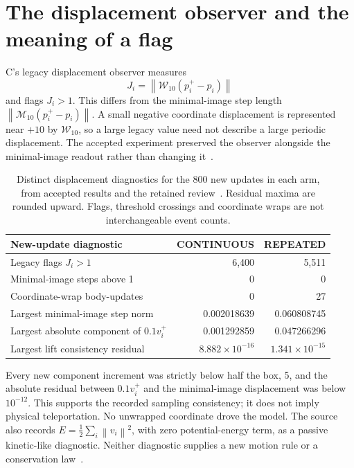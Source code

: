 \documentclass[11pt,a4paper]{article}
\newcommand{\norm}[1]{\left\lVert #1\right\rVert}
\newcommand{\mi}{\mathcal M_{10}}
\newcommand{\wrap}{\mathcal W_{10}}
\begin{document}
\section{The displacement observer and the meaning of a flag}
\label{sec:observer}
C's legacy displacement observer measures
\begin{equation}
 J_i=\norm{\wrap(p_i^+-p_i)}
 \label{eq:legacy}
\end{equation}
and flags $J_i>1$. This differs from the minimal-image step length $\norm{\mi(p_i^+-p_i)}$. A small negative coordinate displacement is represented near $+10$ by $\wrap$, so a large legacy value need not describe a large periodic displacement. The accepted experiment preserved the observer alongside the minimal-image readout rather than changing it~\cite{source,sim02}.

\begin{table}[htbp]
\centering\small
\begin{tabular}{lrr}
\toprule New-update diagnostic & CONTINUOUS & REPEATED \\
\midrule
Legacy flags $J_i>1$ & 6,400 & 5,511 \\
Minimal-image steps above 1 & 0 & 0 \\
Coordinate-wrap body-updates & 0 & 27 \\
Largest minimal-image step norm & 0.002018639 & 0.060808745 \\
Largest absolute component of $0.1v_i^+$ & 0.001292859 & 0.047266296 \\
Largest lift consistency residual & $8.882\!\times\!10^{-16}$ & $1.341\!\times\!10^{-15}$ \\
\bottomrule
\end{tabular}
\caption{Distinct displacement diagnostics for the 800 new updates in each arm, from accepted results and the retained review~\cite{sim02,reviewdata}. Residual maxima are rounded upward. Flags, threshold crossings and coordinate wraps are not interchangeable event counts.}
\label{tab:observer}
\end{table}

Every new component increment was strictly below half the box, 5, and the absolute residual between $0.1v_i^+$ and the minimal-image displacement was below $10^{-12}$. This supports the recorded sampling consistency; it does not imply physical teleportation. No unwrapped coordinate drove the model. The source also records $E=\tfrac12\sum_i\norm{v_i}^2$, with zero potential-energy term, as a passive kinetic-like diagnostic. Neither diagnostic supplies a new motion rule or a conservation law~\cite{sim02,reviewdata}.
\end{document}
